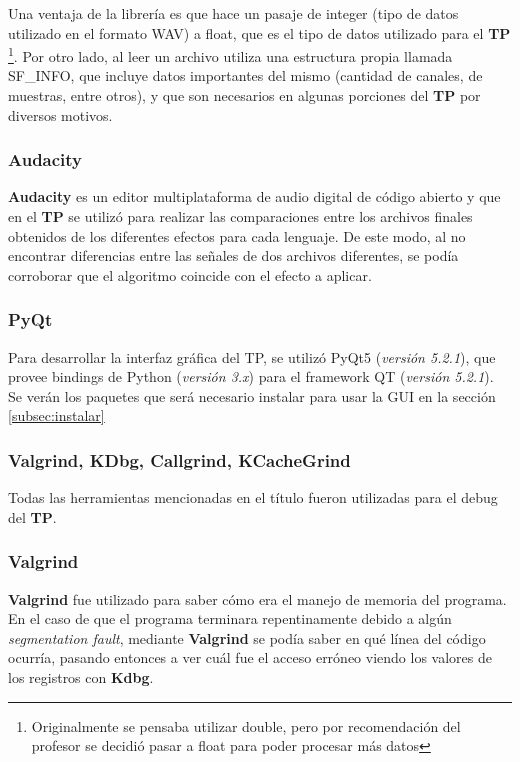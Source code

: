 \documentclass[a4paper,spanish,12pt]{article}
\begin{document}
Una ventaja de la librería es que hace un pasaje de integer (tipo de datos utilizado en el formato WAV) a float, que es el tipo de datos utilizado para el \textbf{TP} \footnote{Originalmente se pensaba utilizar double, pero por recomendación del profesor se decidió pasar a float para poder procesar más datos}. Por otro lado, al leer un archivo utiliza una estructura propia llamada SF\_INFO, que incluye datos importantes del mismo (cantidad de canales, de muestras, entre otros), y que son necesarios en algunas porciones del \textbf{TP} por diversos motivos.

\subsubsection{Audacity}
\label{subsec:audacity}
\textbf{Audacity} es un editor multiplataforma de audio digital de código abierto y que en el \textbf{TP} se utilizó para realizar las comparaciones entre los archivos finales obtenidos de los diferentes efectos para cada lenguaje. De este modo, al no encontrar diferencias entre las señales de dos archivos diferentes, se podía corroborar que el algoritmo coincide con el efecto a aplicar.

\subsubsection{PyQt}
Para desarrollar la interfaz gráfica del TP, se utilizó PyQt5 (\textit{versión 5.2.1}), que provee bindings de Python (\textit{versión 3.x}) para el framework QT (\textit{versión 5.2.1}). Se verán los paquetes que será necesario instalar para usar la GUI en la sección \ref{subsec:instalar}

\subsubsection{Valgrind, KDbg, Callgrind, KCacheGrind}
Todas las herramientas mencionadas en el título fueron utilizadas para el debug del \textbf{TP}.

\subsubsection*{Valgrind}
\textbf{Valgrind} fue utilizado para saber cómo era el manejo de memoria del programa. En el caso de que el programa terminara repentinamente debido a algún \textit{segmentation fault}, mediante \textbf{Valgrind} se podía saber en qué línea del código ocurría, pasando entonces a ver cuál fue el acceso erróneo viendo los valores de los registros con \textbf{Kdbg}. 
\end{document}
